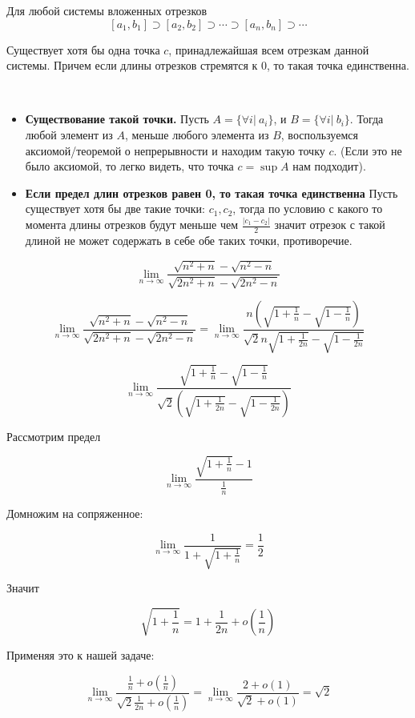 \begin{theorem}
	Для любой системы вложенных отрезков 
	\[[a_1, b_1] \supset [a_2, b_2] \supset \cdots \supset [a_n, b_n] \supset \cdots \]

	Существует хотя бы одна точка $c$, принадлежайшая всем отрезкам данной системы. Причем если длины отрезков стремятся к 0, то такая точка единственна.
\end{theorem}

\begin{Proof}
	\  \\
	\begin{itemize}
		\item \textbf{Существование такой точки.} Пусть $A = \{\forall i| \ a_i\}$, и $B = \{\forall i| \ b_i\}$. Тогда любой элемент из $A$, меньше любого элемента из $B$, воспользуемся аксиомой/теоремой о непрерывности и находим такую точку $c$. (Если это не было аксиомой, то легко видеть, что точка $c = \sup A$ нам подходит).

		\item \textbf{Если предел длин отрезков равен 0, то такая точка единственна} Пусть существует хотя бы две такие точки: $c_1, c_2$, тогда по условию с какого то момента длины отрезков будут меньше чем $\frac{|c_1 - c_2|}{2}$ значит отрезок с такой длиной не может содержать в себе обе таких точки, противоречие.
	\end{itemize}
\end{Proof}

\begin{task}
	\[ \lim_{n \rightarrow \infty} \frac{\sqrt{n^2 + n} - \sqrt{n^2 - n}}{\sqrt{2n^2 + n} - \sqrt{2n^2 - n}}\]

	\[ \lim_{n \rightarrow \infty} \frac{\sqrt{n^2 + n} - \sqrt{n^2 - n}}{\sqrt{2n^2 + n} - \sqrt{2n^2 - n}} = \lim_{n \rightarrow \infty} \frac{n (\sqrt{1 + \frac1n} - \sqrt{1 - \frac1n})}{\sqrt2n\sqrt{1 + \frac{1}{2 n}} - \sqrt{1 - \frac{1}{2 n}}}\]

	\[\lim_{n \rightarrow \infty} \frac{\sqrt{1 + \frac1n} - \sqrt{1 - \frac1n}}{\sqrt2(\sqrt{1 + \frac{1}{2 n}} - \sqrt{1 - \frac{1}{2 n}})}\]

	Рассмотрим предел

	\[\lim_{n \rightarrow \infty} \frac{\sqrt{1 + \frac1n} - 1}{\frac1n}\]

	Домножим на сопряженное:

	\[\lim_{n \rightarrow \infty} \frac{1}{1 + \sqrt{1 + \frac1n}} = \frac12\]

	Значит

	\[\sqrt{1 + \frac1n} = 1 + \frac{1}{2 n} + o\left(\frac{1}{n} \right)\]

	Применяя это к нашей задаче:

	\[\lim_{n \rightarrow \infty} \frac{\frac{1}{n} + o\left(\frac{1}{n} \right)}{\sqrt2 \frac{1}{2n} + o\left(\frac{1}{n} \right)} = \lim_{n \rightarrow \infty} \frac{2 + o\left(1\right)}{\sqrt2 + o\left(1\right)} = \sqrt2 \]
\end{task}

